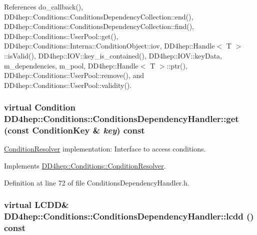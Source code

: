 References do\_\-callback(), DD4hep::Conditions::ConditionsDependencyCollection::end(), DD4hep::Conditions::ConditionsDependencyCollection::find(), DD4hep::Conditions::UserPool::get(), DD4hep::Conditions::Interna::ConditionObject::iov, DD4hep::Handle$<$ T $>$::isValid(), DD4hep::IOV::key\_\-is\_\-contained(), DD4hep::IOV::keyData, m\_\-dependencies, m\_\-pool, DD4hep::Handle$<$ T $>$::ptr(), DD4hep::Conditions::UserPool::remove(), and DD4hep::Conditions::UserPool::validity().\hypertarget{class_d_d4hep_1_1_conditions_1_1_conditions_dependency_handler_a76eb4e4234146f775b4c32396acad7f8}{
\subsubsection[{get}]{\setlength{\rightskip}{0pt plus 5cm}virtual {\bf Condition} DD4hep::Conditions::ConditionsDependencyHandler::get (const {\bf ConditionKey} \& {\em key}) const}}
\label{class_d_d4hep_1_1_conditions_1_1_conditions_dependency_handler_a76eb4e4234146f775b4c32396acad7f8}


\hyperlink{class_d_d4hep_1_1_conditions_1_1_condition_resolver}{ConditionResolver} implementation: Interface to access conditions. 

Implements \hyperlink{class_d_d4hep_1_1_conditions_1_1_condition_resolver_a8d33b49336349b3cf4877244572f1827}{DD4hep::Conditions::ConditionResolver}.

Definition at line 72 of file ConditionsDependencyHandler.h.\hypertarget{class_d_d4hep_1_1_conditions_1_1_conditions_dependency_handler_afef4a9e239622497629139c66a6ab7df}{
\subsubsection[{lcdd}]{\setlength{\rightskip}{0pt plus 5cm}virtual LCDD\& DD4hep::Conditions::ConditionsDependencyHandler::lcdd () const}}
\label{class_d_d4hep_1_1_conditions_1_1_conditions_dependency_handler_afef4a9e239622497629139c66a6ab7df}


